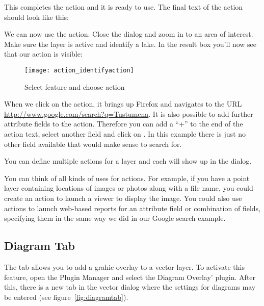 This completes the action and it is ready to use. The final text of the action
should look like this:


We can now use the action. Close the  dialog and zoom in to an area
of interest. Make sure the  layer is active and identify a
lake. In the result box you'll now see that our action is visible:

\begin{figure}[ht]
   \centering
   \texttt{[image: action\_identifyaction]} 
   \caption{Select feature and choose action \nixcaption}\label{fig:identify_action}
\end{figure}

When we click on the action, it brings up Firefox and navigates to the URL
\url{http://www.google.com/search?q=Tustumena}. It is also possible to add further 
attribute fields to the action. Therefore you can add a ``+'' to the end of the action 
text, select another field and click on . In this example there 
is just no other field available that would make sense to search for.

You can define multiple actions for a layer and each will show up in the
 dialog. 

You can think of all kinds of uses for actions. For example, if you have a point layer
containing locations of images or photos along with a file name, you could
create an action to launch a viewer to display the image. You could also use
actions to launch web-based reports for an attribute field or combination of
fields, specifying them in the same way we did in our Google search example.

\subsection{Diagram Tab}\label{sec:diagram}

The  tab allows you to add a grahic overlay to a vector layer.
To activate this feature, open the Plugin Manager and select the Diagram Overlay' 
plugin. After this, there is a new tab in the vector  dialog where the settings for diagrams may be entered (see
figure~\ref{fig:diagramtab}).

